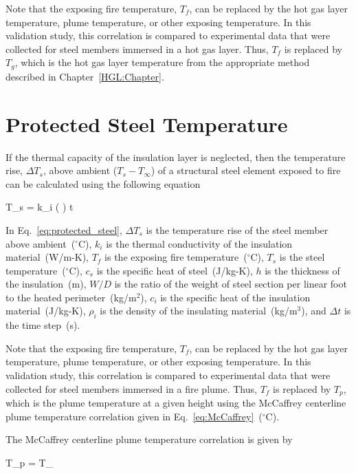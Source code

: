 Note that the exposing fire temperature, $T_f$, can be replaced by the hot gas layer temperature, plume temperature, or other exposing temperature. In this validation study, this correlation is compared to experimental data that were collected for steel members immersed in a hot gas layer. Thus, $T_f$ is replaced by $T_g$, which is the hot gas layer temperature from the appropriate method described in Chapter~\ref{HGL:Chapter}.


\clearpage


\section{Protected Steel Temperature}
\label{info:protected_steel_temperature}

If the thermal capacity of the insulation layer is neglected, then the temperature rise, $\Delta T_s$, above ambient ($T_s - T_\infty$) of a structural steel element exposed to fire can be calculated using the following equation

\be
\Delta T_s = k_i \left(  \right) \Delta t
\label{eq:protected_steel}
\ee

In Eq.~\ref{eq:protected_steel}, $\Delta T_s$ is the temperature rise of the steel member above ambient~($^\circ$C), $k_i$ is the thermal conductivity of the insulation material~(W/m-K), $T_f$ is the exposing fire temperature~($^\circ$C), $T_s$ is the steel temperature~($^\circ$C), $c_s$ is the specific heat of steel~(J/kg-K), $h$ is the thickness of the insulation~(m), $W/D$ is the ratio of the weight of steel section per linear foot to the heated perimeter~(kg/m$^2$), $c_i$ is the specific heat of the insulation material~(J/kg-K), $\rho_i$ is the density of the insulating material~(kg/m$^3$), and $\Delta t$ is the time step~(s).

Note that the exposing fire temperature, $T_f$, can be replaced by the hot gas layer temperature, plume temperature, or other exposing temperature. In this validation study, this correlation is compared to experimental data that were collected for steel members immersed in a fire plume. Thus, $T_f$ is replaced by $T_p$, which is the plume temperature at a given height using the McCaffrey centerline plume temperature correlation given in Eq.~\ref{eq:McCaffrey}~($^\circ$C).

The McCaffrey centerline plume temperature correlation is given by

\be
\Delta T_p =  T_\infty
\label{eq:McCaffrey}
\ee

